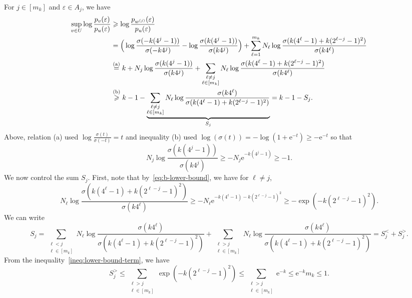 \documentclass[11pt, letterpaper, hidelinks]{article}
\makeatletter
\renewcommand{\proofname}{\textit{\textbf{Proof}}}
\renewenvironment{proof}[1][\proofname]{\par\pushQED{\qed}\normalfont \topsep6\p@\@plus6\p@\relax\trivlist\item[\hskip\labelsep#1\@addpunct{}]\ignorespaces}{\popQED\endtrivlist\@endpefalse}
\newcommand{\e}{\mathrm{e}}
\newcommand{\1}{\mathbf 1}
\newcommand{\eps}{\varepsilon}
\renewcommand{\leq}{\leqslant}
\renewcommand{\geq}{\geqslant}
\theoremstyle{plain}
\theoremstyle{definition}
\makeatother
\begin{document}
\begin{proof}[Proof of~\Cref{lem:a-single-block}]
For $j \in [m_k]$ and $\eps \in A_j$, we have 
\begin{align}
\sup_{v \in U} \log \frac{p_v(\eps)}{p_u(\eps)} &\geq \log \frac{p_{w^{(j)}}(\eps)}{p_u(\eps)}\\ 
&= 
\Big( 
\log \frac{\sigma(-k(4^j -1))}{\sigma(-k4^j)} - \log \frac{\sigma(k(4^j -1))}{\sigma(k4^j)}\Big) +  
\sum_{\ell = 1}^{m_k}
N_\ell \log \frac{\sigma(k(4^\ell -1) + k(2^{\ell - j} - 1)^2)}{\sigma(k 4^\ell)} \\ 
&\stackrel{{\rm(a)}}{=} k + N_j \log \frac{\sigma(k(4^j -1))}{\sigma(k 4^j)} + 
\sum_{\substack{\ell \neq j \\ \ell \in [m_k]}} 
N_\ell \log \frac{\sigma(k(4^\ell -1) + k(2^{\ell - j} - 1)^2)}{\sigma(k 4^\ell)} \\ 
&\stackrel{{\rm(b)}}{\geq}
k - 1
- \underbrace{\sum_{\substack{\ell \neq j \\ \ell \in [m_k]}} 
N_\ell \log \frac{\sigma(k 4^\ell)}{\sigma(k(4^\ell -1) + k(2^{\ell - j} - 1)^2)}}_{S_{j}} = k - 1 - S_{j}.
\label{ineq:in-terms-of-sum}
\end{align}
Above, relation (a) used $\log \tfrac{\sigma(t)}{\sigma(-t)} = t$ and inequality (b) used $\log(\sigma(t)) = -\log(1+\e^{-t}) \geq -\e^{-t}$ 
so that \[
N_j \log \frac{\sigma(k(4^j -1))}{\sigma(k 4^j)} \geq -N_j \e^{-k(4^j - 1)} \geq -1.
\]
We now control the sum $S_j$. 
First, note that by~\eqref{eq:b-lower-bound}, we have for $\ell \neq j$, 
\begin{equation}\label{ineq:lower-bound-term}
N_\ell \log \frac{\sigma(k(4^\ell -1) + k(2^{\ell - j} - 1)^2)}{\sigma(k 4^\ell)} \geq -N_\ell \e^{-k(4^\ell - 1) - k(2^{\ell - j} - 1)^2} 
\geq -\exp(-k(2^{\ell - j} - 1)^2). 
\end{equation}
We can write 
\begin{equation}
S_j = \sum_{\substack{\ell < j\\ \ell \in [m_k]}} N_\ell \log \frac{\sigma(k 4^\ell)}{\sigma(k(4^\ell -1) + k(2^{\ell - j} - 1)^2)} + 
\sum_{\substack{\ell > j\\ \ell \in [m_k]}} N_\ell \log \frac{\sigma(k 4^\ell)}{\sigma(k(4^\ell -1) + k(2^{\ell - j} - 1)^2)}
= S_{j}^{<} + S_{j}^{>}.
\end{equation}
From the inequality~\eqref{ineq:lower-bound-term}, we have 
\begin{equation}
\label{ineq:lower-bound-S_j_big}
S_{j}^{>} \leq \sum_{\substack{\ell > j\\ \ell \in [m_k]}}
\exp(-k(2^{\ell - j} - 1)^2) \leq \sum_{\substack{\ell > j\\ \ell \in [m_k]}} \e^{-k} \leq \e^{-k} m_k \leq 1. 

\end{equation}
\end{proof}
\end{document}
